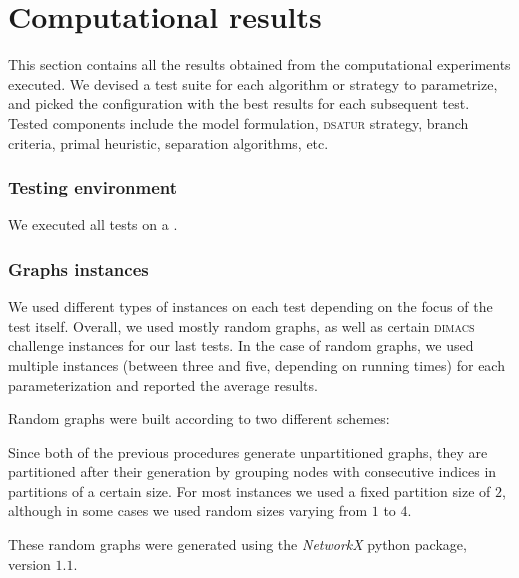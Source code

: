 
\section{Computational results}
\label{sec:results}

This section contains all the results obtained from the computational experiments executed. We devised a test suite for each algorithm or strategy to parametrize, and picked the configuration with the best results for each subsequent test. Tested components include the model formulation, \textsc{dsatur} strategy, branch criteria, primal heuristic, separation algorithms, etc.

\subsubsection*{Testing environment}

We executed all tests on a .

\subsubsection*{Graphs instances}

We used different types of instances on each test depending on the focus of the test itself. Overall, we used mostly random graphs, as well as certain \textsc{dimacs} challenge instances\cite{dimacs} for our last tests. In the case of random graphs, we used multiple instances (between three and five, depending on running times) for each parameterization and reported the average results.  

Random graphs were built according to two different schemes:
\begin{itemize}
\end{itemize}


Since both of the previous procedures generate unpartitioned graphs, they are partitioned after their generation by grouping nodes with consecutive indices in partitions of a certain size. For most instances we used a fixed partition size of $2$, although in some cases we used random sizes varying from $1$ to $4$.

These random graphs were generated using the \textit{NetworkX} python package\cite{networkx}, version $1.1$.